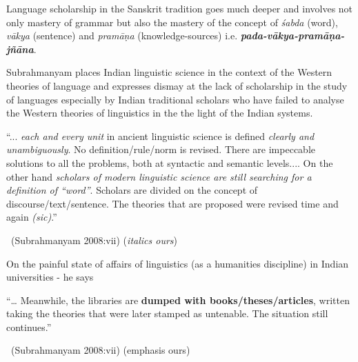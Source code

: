 Language scholarship in the Sanskrit tradition goes much deeper and involves not only mastery of grammar but also the mastery of the concept of \textit{śabda} (word), \textit{vākya} (sentence) and \textit{pramāṇa} (knowledge-sources) i.e. \textbf{\textit{pada-vākya-pramāṇa-jñāna}}.

Subrahmanyam places Indian linguistic science in the context of the Western theories of language and expresses dismay at the lack of scholarship in the study of languages especially by Indian traditional scholars who have failed to analyse the Western theories of linguistics in the the light of the Indian systems.

\begin{myquote}
“... \textit{each and every unit} in ancient linguistic science is defined \textit{clearly and unambiguously}. No definition/rule/norm is revised. There are impeccable solutions to all the problems, both at syntactic and semantic levels.... On the other hand \textit{scholars of modern linguistic science are still searching for a definition of “word”}. Scholars are divided on the concept of discourse/text/sentence. The theories that are proposed were revised time and again \textit{(sic)}.”

\vskip -3pt

~\hfill (Subrahmanyam 2008:vii) (\textit{italics ours})
\end{myquote}

On the painful state of affairs of linguistics (as a humanities disci\-pline) in Indian universities - he says

\begin{myquote}
“… Meanwhile, the libraries are \textbf{dumped with books/theses/articles}, written taking the theories that were later stamped as untenable. The situation still continues.”

\vskip -3pt

~\hfill (Subrahmanyam 2008:vii) (emphasis ours)
\end{myquote}

